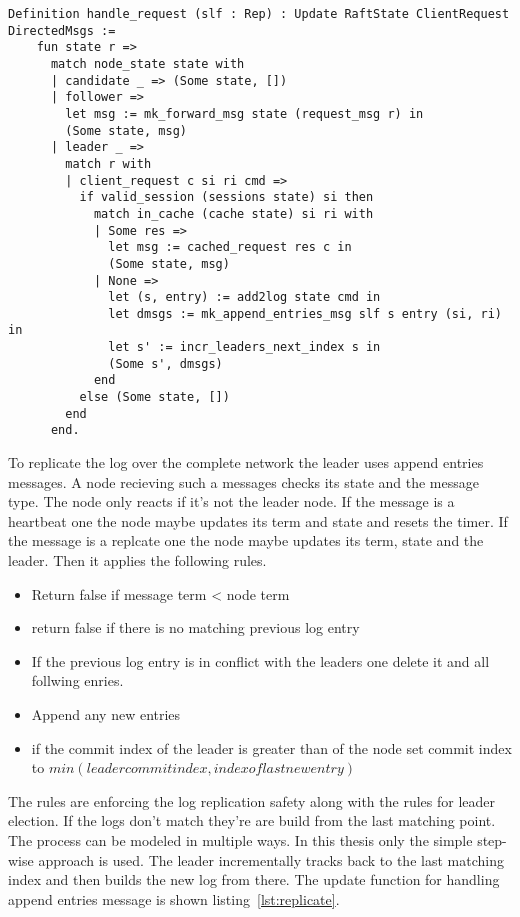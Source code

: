 \begin{lstlisting}[style=coq,label=lst:request,
caption=The definitions on how a node changes it node state.]
  Definition handle_request (slf : Rep) : Update RaftState ClientRequest DirectedMsgs :=
    fun state r =>
      match node_state state with
      | candidate _ => (Some state, [])
      | follower =>
        let msg := mk_forward_msg state (request_msg r) in
        (Some state, msg)
      | leader _ =>
        match r with
        | client_request c si ri cmd =>
          if valid_session (sessions state) si then
            match in_cache (cache state) si ri with
            | Some res =>
              let msg := cached_request res c in
              (Some state, msg)
            | None =>
              let (s, entry) := add2log state cmd in
              let dmsgs := mk_append_entries_msg slf s entry (si, ri) in
              let s' := incr_leaders_next_index s in
              (Some s', dmsgs)
            end
          else (Some state, [])
        end
      end.
\end{lstlisting}

To replicate the log over the complete network the leader uses
append entries messages. A node recieving such a messages checks its
state and the message type. The node only reacts if it's not the leader node.
If the message is a heartbeat one the node maybe updates its term and
state and resets the timer. 
If the message is a replcate one the node maybe updates its term, state
and the leader. Then it applies the following rules.

\begin{itemize}
  \item Return false if message term < node term
  \item return false if there is no matching previous log entry
  \item If the previous log entry is in conflict with the leaders one
    delete it and all follwing enries.
  \item Append any new entries
  \item if the commit index of the leader is greater than of the node
    set commit index to $min(leader commit index, index of last new entry)$
\end{itemize}

The rules are enforcing the log replication safety along with the
rules for leader election. If the logs don't match they're
are build from the last matching point. The process can be modeled
in multiple ways. In this thesis only the simple step-wise approach is
used. The leader incrementally tracks back to the last matching index
and then builds the new log from there. The update function for
handling append entries message is shown listing~\ref{lst:replicate}.


